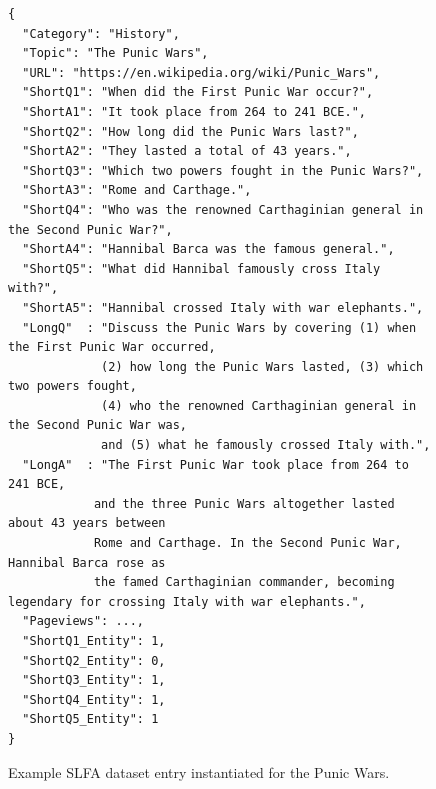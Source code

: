 \documentclass[11pt]{article}
\begin{document}
\begin{figure}[t]
\small
\centering
\begin{minipage}{0.96\textwidth}
\begin{verbatim}
{
  "Category": "History",
  "Topic": "The Punic Wars",
  "URL": "https://en.wikipedia.org/wiki/Punic_Wars",
  "ShortQ1": "When did the First Punic War occur?",
  "ShortA1": "It took place from 264 to 241 BCE.",
  "ShortQ2": "How long did the Punic Wars last?",
  "ShortA2": "They lasted a total of 43 years.",
  "ShortQ3": "Which two powers fought in the Punic Wars?",
  "ShortA3": "Rome and Carthage.",
  "ShortQ4": "Who was the renowned Carthaginian general in the Second Punic War?",
  "ShortA4": "Hannibal Barca was the famous general.",
  "ShortQ5": "What did Hannibal famously cross Italy with?",
  "ShortA5": "Hannibal crossed Italy with war elephants.",
  "LongQ"  : "Discuss the Punic Wars by covering (1) when the First Punic War occurred, 
             (2) how long the Punic Wars lasted, (3) which two powers fought, 
             (4) who the renowned Carthaginian general in the Second Punic War was,
             and (5) what he famously crossed Italy with.",
  "LongA"  : "The First Punic War took place from 264 to 241 BCE,
            and the three Punic Wars altogether lasted about 43 years between
            Rome and Carthage. In the Second Punic War, Hannibal Barca rose as
            the famed Carthaginian commander, becoming legendary for crossing Italy with war elephants.",
  "Pageviews": ...,
  "ShortQ1_Entity": 1,
  "ShortQ2_Entity": 0,
  "ShortQ3_Entity": 1,
  "ShortQ4_Entity": 1,
  "ShortQ5_Entity": 1
}
\end{verbatim}
\end{minipage}
\caption{Example SLFA dataset entry instantiated for the Punic Wars.}
\label{fig:slfa-json-schema}
\end{figure}
\end{document}
